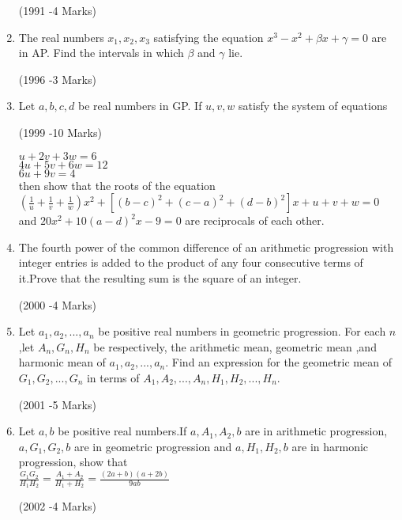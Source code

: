 \documentclass[journal,12pt,twocolumn]{IEEEtran}
\theoremstyle{remark}
\begin{document}
\begin{enumerate}
      \hfill(1991 -4 Marks)
       

		\item  The real numbers $ x_{1},x_{2},x_{3} $ satisfying the equation $ x^{3}-x^{2}+\beta x+\gamma=0 $ are in AP. Find the intervals in which $ \beta $ and $\gamma$ lie.
       
      \hfill(1996 -3 Marks)
      

      \item  Let $ a,b,c,d $ be real numbers in GP. If $u,v,w$ satisfy the system of equations  
    
      \hfill(1999 -10 Marks)
      
      $    u+2v+3w=6 $ \\
      $    4u+5v+6w=12 $ \\
      $    6u+9v=4 $ \\
      then show that the roots of the equation \\
      $(\frac{1}{u}+\frac{1}{v}+\frac{1}{w})x^{2}+[(b-c)^{2}+(c-a)^{2}+(d-b)^{2}]x+u+v+w=0 $ and $ 20x^{2}+10(a-d)^{2}x-9=0 $ are reciprocals of each other.

      \item The fourth power of the common difference of an arithmetic progression with integer entries is added to the product of any four consecutive terms of it.Prove that the resulting sum is the square of an integer.
      
      \hfill(2000 -4 Marks)
    

      \item Let $ a_{1},a_{2},...,a_{n} $ be positive real numbers in geometric progression. For each $n$,let $ A_{n},G_{n},H_{n} $ be respectively, the arithmetic mean, geometric mean ,and harmonic mean of $ a_{1},a_{2},...,a_{n}.$ Find an expression for the geometric mean of $ G_{1},G_{2},...,G_{n} $ in terms of $ A_{1},A_{2},...,A_{n},H_{1},H_{2},...,H_{n}.$ 
      
	                                  \hfill(2001 -5 Marks)                              
       
       \item Let $a,b$ be positive real numbers.If $ a,A_{1},A_{2},b $ are in arithmetic progression, $ a,G_{1},G_{2},b $ are in geometric progression and $ a,H_{1},H_{2},b $ are in harmonic progression, show that \\ 
	       $ \frac{G_{1}G_{2}}{H_{1}H_{2}}=\frac{A_{1}+A_{2}}{H_{1}+H_{2}}=\frac{(2a+b)(a+2b)}{9ab} $ 

\hfill(2002 -4 Marks)                             
     

\end{enumerate}
\end{document}
